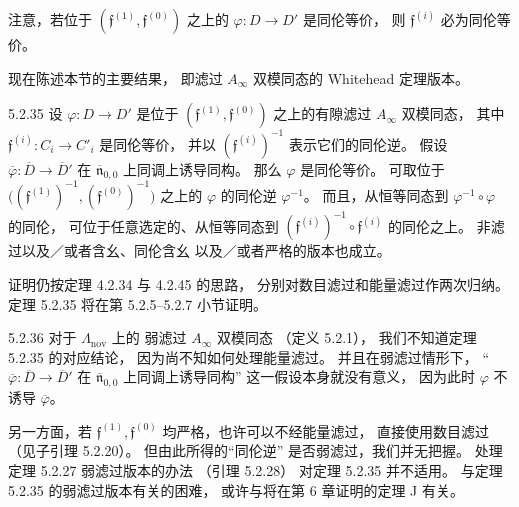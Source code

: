注意，若位于
$(\mathfrak f^{(1)},\mathfrak f^{(0)})$
之上的
$\varphi:D\to D'$ 是同伦等价，
则 $\mathfrak f^{(i)}$ 必为同伦等价。

现在陈述本节的主要结果，
即滤过 $A_\infty$ 双模同态的
Whitehead 定理版本。

\begin{theorem}{5.2.35}\label{thm:5-2-35}
设 $\varphi:D\to D'$ 是位于
$(\mathfrak f^{(1)},\mathfrak f^{(0)})$
之上的有隙滤过 $A_\infty$ 双模同态，
其中 $\mathfrak f^{(i)}:C_i\to C'_i$
是同伦等价，
并以 $(\mathfrak f^{(i)})^{-1}$
表示它们的同伦逆。
假设 $\overline\varphi:
\overline D\to\overline D'$
在 $\overline{\mathfrak n}_{0,0}$
上同调上诱导同构。
那么 $\varphi$ 是同伦等价。
可取位于
$\bigl((\mathfrak f^{(1)})^{-1},
(\mathfrak f^{(0)})^{-1}\bigr)$
之上的 $\varphi$ 的同伦逆
$\varphi^{-1}$。
而且，从恒等同态到
$\varphi^{-1}\circ\varphi$ 的同伦，
可位于任意选定的、从恒等同态到
$(\mathfrak f^{(i)})^{-1}\circ
\mathfrak f^{(i)}$ 的同伦之上。
非滤过以及／或者含幺、同伦含幺
以及／或者严格的版本也成立。
\end{theorem}

证明仍按定理 4.2.34 与 4.2.45 的思路，
分别对数目滤过和能量滤过作两次归纳。
定理 5.2.35 将在第 5.2.5--5.2.7 小节证明。

\begin{remark}{5.2.36}\label{rem:5-2-36}
对于 $\Lambda_{\mathrm{nov}}$ 上的
弱滤过 $A_\infty$ 双模同态
（定义 5.2.1），
我们不知道定理 5.2.35 的对应结论，
因为尚不知如何处理能量滤过。
并且在弱滤过情形下，
“$\overline\varphi:\overline D\to
\overline D'$ 在
$\overline{\mathfrak n}_{0,0}$ 上同调上诱导同构”
这一假设本身就没有意义，
因为此时 $\varphi$ 不诱导
$\overline\varphi$。

另一方面，若
$\mathfrak f^{(1)},\mathfrak f^{(0)}$
均严格，也许可以不经能量滤过，
直接使用数目滤过（见子引理 5.2.20）。
但由此所得的“同伦逆”
是否弱滤过，我们并无把握。
处理定理 5.2.27 弱滤过版本的办法
（引理 5.2.28）
对定理 5.2.35 并不适用。
与定理 5.2.35 的弱滤过版本有关的困难，
或许与将在第 6 章证明的定理 J 有关。
\end{remark}
